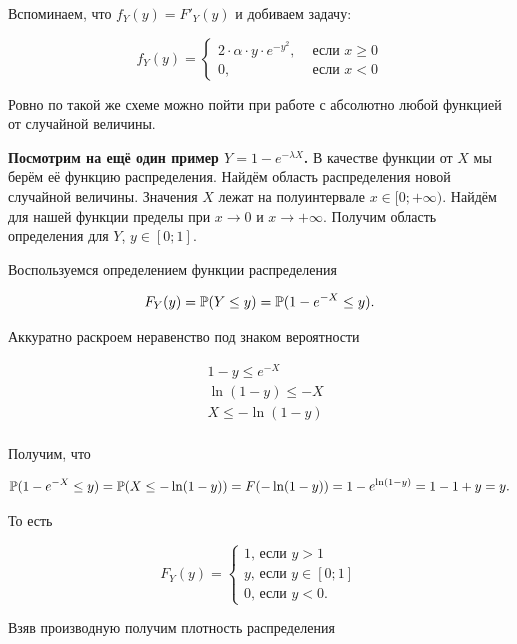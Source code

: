 \documentclass[12pt, a4paper, oneside]{article}
\begin{document}
Вспоминаем, что $f_Y(y) = F'_Y(y)$ и добиваем задачу: 

$$
f_Y(y) = \begin{cases} 2 \cdot \alpha \cdot y \cdot e^{- y^2}, &\text{ если } x \ge 0 \\ 0, &\text{ если } x < 0  \end{cases}
$$

Ровно по такой же схеме можно пойти при работе с абсолютно любой функцией от случайной величины. 

\textbf{Посмотрим на ещё один пример $Y = 1 - e^{-\lambda X}$.} В качестве функции от $X$ мы берём её функцию распределения. Найдём область распределения новой случайной величины. Значения $X$ лежат на полуинтервале $x \in [0; +\infty)$. Найдём для нашей функции пределы при $x \to 0$ и $x \to +\infty$. Получим область определения для $Y$, $y \in [0; 1]$. 

Воспользуемся определением функции распределения

\begin{equation*}
F_Y(y) = \mathbb{P}(Y \le y) = \mathbb{P}(1 - e^{-X} \le y). 
\end{equation*}

Аккуратно раскроем неравенство под знаком вероятности

\begin{equation*}
    \begin{aligned}
        & 1 - y \le e^{-X} \\
        & \ln(1 - y) \le -X \\
        & X \le -\ln(1-y) \\
    \end{aligned}
\end{equation*}

Получим, что  

\begin{equation*}
\mathbb{P}(1 - e^{-X} \le y) = \mathbb{P}(X \le -\ln(1-y)) = F(-\ln(1-y)) = 1 - e^{\ln(1-y)} = 1 - 1 + y = y.
\end{equation*}

То есть

\begin{equation*}
F_Y(y) = \begin{cases} 1 \text{, если } y > 1 \\ y \text{, если } y \in [0; 1] \\ 0 \text{, если } y < 0.  \end{cases}
\end{equation*}

Взяв производную получим плотность распределения
\end{document}
